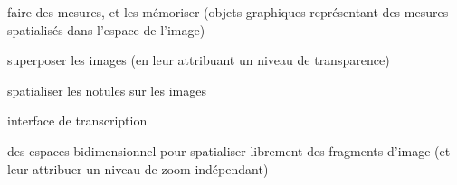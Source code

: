 \startchapter[title={Travail sur les images}]

\startTODO
\startitemize
	\item faire des mesures, et les mémoriser (objets graphiques représentant des mesures spatialisés dans l'espace de l'image)
	\item superposer les images (en leur attribuant un niveau de transparence)
	\item spatialiser les notules sur les images
	\item interface de transcription
	\item des espaces bidimensionnel pour spatialiser librement des fragments d'image (et leur attribuer un niveau de zoom indépendant)
\stopitemize
\stopTODO